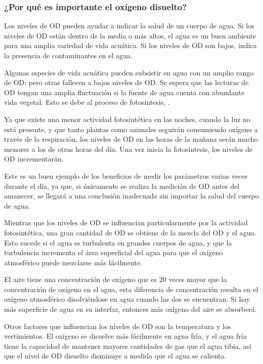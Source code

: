 \subsubsection{¿Por qu\'e es importante el oxígeno disuelto?}
Los niveles de OD pueden ayudar a indicar la salud de un cuerpo de agua. Si los niveles de OD están dentro de la media o más altos, el agua es un buen ambiente para una amplia variedad de vida acuática. 
Si los niveles de OD son bajos, indica la presencia de contaminantes en el agua. 

Algunas especies de vida acuática pueden subsistir en agua con un amplio rango de OD; pero otras fallecen a bajos niveles de OD.
Se espera que las lecturas de OD tengan una amplia fluctuación si la fuente de agua cuenta con abundante vida vegetal. Esto se debe al proceso de fotosíntesis, \cite{hannacolombia_guipara_nodate}. 

Ya que existe una menor actividad fotosintética en las noches, cuando la luz no está presente, y que tanto plantas como animales seguirán consumiendo oxígeno a través de la respiración, los niveles de OD en las horas de la mañana serán mucho menores a los de otras horas del día. Una vez inicia la fotosíntesis, los niveles de OD incrementarán. 

Este es un buen ejemplo de los beneficios de medir los parámetros varias veces durante el día, ya que, si únicamente se realiza la medición de OD antes del amanecer, se llegará a una conclusión inadecuada sin importar la salud del cuerpo de agua.

Mientras que los niveles de OD se influencian particularmente por la actividad fotosintética, una gran cantidad de OD se obtiene de la mezcla del OD y el agua. Esto sucede si el agua es turbulenta en grandes cuerpos de agua, y que la turbulencia incrementa el área superficial del agua para que el oxígeno atmosférico puede mezclarse más fácilmente. 

El aire tiene una concentración de oxígeno que es 20 veces mayor que la concentración de ox\'igeno en el agua, esta diferencia de concentración resulta en el oxígeno atmosférico disolviéndose en agua cuando las dos se encuentran. 
Si hay más superficie de agua en su interfaz, entonces más oxígeno del aire se absorberá.

Otros factores que influencian los niveles de OD son la temperatura y los vertimientos. El ox\'igeno se disuelve más f\'acilmente en agua fría, y el agua fría tiene la capacidad de mantener mayores cantidades de gas que el agua tibia, así que el nivel de OD disuelto disminuye a medida que el agua se calienta.

